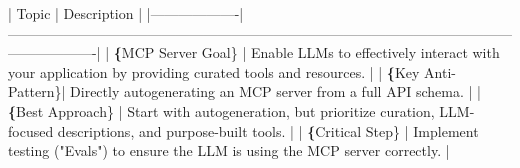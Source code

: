 \documentclass[11pt,a4paper]{article}
\begin{document}
| Topic             | Description                                                                                                                   |
|-------------------|-------------------------------------------------------------------------------------------------------------------------------|
| \textbf\{MCP Server Goal\} | Enable LLMs to effectively interact with your application by providing curated tools and resources.                          |
| \textbf\{Key Anti-Pattern\}| Directly autogenerating an MCP server from a full API schema.                                                               |
| \textbf\{Best Approach\}   | Start with autogeneration, but prioritize curation, LLM-focused descriptions, and purpose-built tools.                    |
| \textbf\{Critical Step\}   | Implement testing ("Evals") to ensure the LLM is using the MCP server correctly.                                           |
\end{document}
